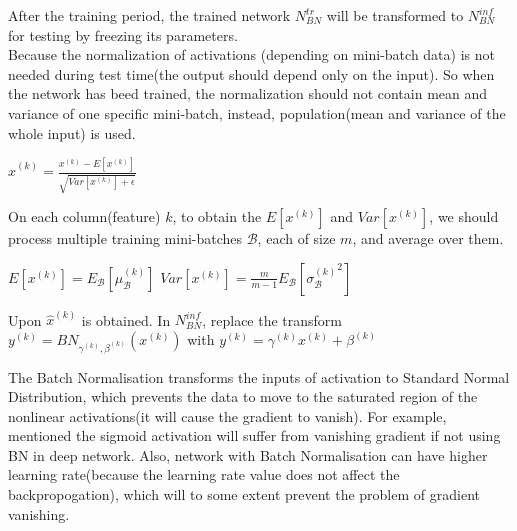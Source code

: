 {{    After the training period, the trained network $N^{tr}_{BN}$ will be transformed to 
    $N^{inf}_{BN}$ for testing by freezing its parameters.  \\ 
    Because the normalization of activations
    (depending on mini-batch data) is not needed during test time(the output should depend only on the input). So when the 
    network has beed trained, the normalization should not contain mean and variance of one 
    specific mini-batch, instead, population(mean and variance of the whole input) is used.

        $\hat{x}^{(k)} = \frac{x^{(k)} - E[x^{(k)}]}{\sqrt{Var[x^{(k)}] + \epsilon}}$

    On each column(feature) $k$, to obtain the $E[x^{(k)}]$ and $Var[x^{(k)}]$, we should 
    process multiple training mini-batches $\mathcal{B}$, each of size $m$, and average over 
    them. 
    
        $E[x^{(k)}] = E_{\mathcal{B}}[\mu_{\mathcal{B}}^{(k)}]$ 
        \qquad
        $Var[x^{(k)}] = \frac{m}{m-1}E_{\mathcal{B}}[{\sigma_{\mathcal{B}}^{(k)}}^2]$ 

    Upon $\hat{x}^{(k)}$ is obtained. In $N^{inf}_{BN}$, replace the transform  
    $y^{(k)} = BN_{\gamma^{(k)}, \beta^{(k)}}(x^{(k)})$ with 
    $y^{(k)} = \gamma^{(k)} x^{(k)} + \beta^{(k)}$

    The Batch Normalisation transforms the inputs of activation to 
    Standard Normal Distribution, which prevents the data to move to the saturated region 
    of the nonlinear activations(it will cause the gradient to vanish). For example, 
    \cite{ioffe2015batch} mentioned the sigmoid activation will suffer from vanishing gradient 
    if not using BN in deep network. Also, network with Batch Normalisation can have higher 
    learning rate(because the learning rate value does not affect the backpropogation), 
    which will to some extent prevent the problem of gradient vanishing. 

}
}

